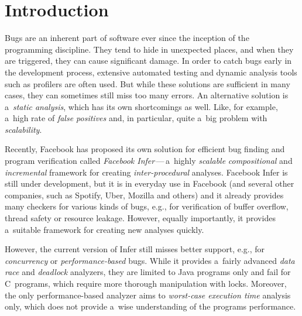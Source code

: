 \documentclass{ExcelAtFIT}
\affiliation{
    \{
    *\href{mailto:xharmi00@stud.fit.vutbr.cz}{xharmi00}, 
    **\href{mailto:xmarci10@stud.fit.vutbr.cz}{xmarci10}, 
    ***\href{mailto:xpavel34@stud.fit.vutbr.cz}{xpavel34}
    \}@stud.fit.vutbr.cz,
    \emph{Faculty of Information Technology, Brno University of Technology}
}
\begin{document}
\startdocument


\section{Introduction}
Bugs are an inherent part of software ever since
the inception of the programming discipline.
They tend to hide in unexpected places, and when
they are triggered, they can cause significant
damage. In order to catch bugs early in the
development process, extensive automated testing
and dynamic analysis tools such as profilers are
often used. But while these solutions are sufficient
in many cases, they can sometimes still miss too
many errors. An alternative solution is a~\emph{static
analysis}, which has its own shortcomings as well.
Like, for example, a~high rate of \emph{false positives}
and, in particular, quite a~big problem with 
\emph{scalability}.

Recently, Facebook has proposed its own solution
for efficient bug finding and program verification
called \emph{Facebook Infer}\,---\,a~highly
\emph{scalable} \emph{compositional} and
\emph{incremental} framework for creating
\emph{inter-procedural} analyses. Facebook Infer is still
under development, but it is in everyday use in
Facebook (and several other companies, such as
Spotify, Uber, Mozilla and others) and it already
provides many checkers for various kinds of bugs,
e.g., for verification of buffer overflow, thread
safety or resource leakage. However, equally
importantly, it provides a~suitable framework
for creating new analyses quickly.

However, the current version of Infer still misses
better support, e.g., for \emph{concurrency} or
\emph{performance-based} bugs. While it provides a~fairly
advanced \emph{data race} and \emph{deadlock} analyzers, 
they are limited to Java programs only and fail for 
C~programs, which require more thorough manipulation with 
locks. Moreover, the only performance-based analyzer aims
to \emph{worst-case execution time} analysis only,
which does not provide a~wise understanding of
the programs performance.
\end{document}
